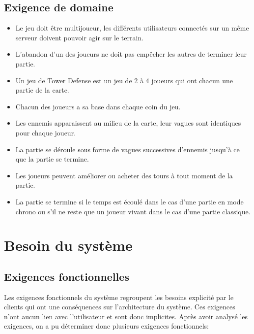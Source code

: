 \documentclass[10pt,a4paper]{article}
\begin{document}
\subsection{Exigence de domaine}

\begin{itemize}
  \item Le jeu doit être multijoueur, les différents \glspl{utilisateur} connectés sur un même \gls{serveur} doivent pouvoir agir sur le terrain.
   \item  L'abandon d'un des \glspl{joueur} ne doit pas empêcher les autres de terminer leur partie. 
   \item Un jeu de \gls{Tower Defense} est un jeu de 2 à 4 \glspl{joueur} qui ont chacun une partie de la carte.
   \item Chacun des \glspl{joueur} a sa base dans chaque coin du jeu.
   \item Les \glspl{ennemi} apparaissent au milieu de la carte, leur vagues sont identiques pour chaque \gls{joueur}.
   \item La partie se déroule sous forme de vagues successives d’\glspl{ennemi} jusqu’à ce que la partie se termine.
   \item  Les \glspl{joueur} peuvent améliorer ou acheter des tours à tout moment de la partie.
   \item  La partie se termine si le temps est écoulé dans le cas d’une partie en mode chrono ou s’il ne reste que un \gls{joueur} vivant dans le cas d’une partie classique.
\end{itemize}
\newpage
\section{Besoin du système}
\subsection{Exigences fonctionnelles}
Les exigences fonctionnels du système regroupent les besoins explicité par le
clients qui ont une conséquences sur l'architecture du système. Ces exigences
n’ont aucun lien avec l’utilisateur et sont donc implicites.
Après avoir analysé les exigences, on a pu déterminer donc plusieurs exigences fonctionnels: \\
\end{document}
